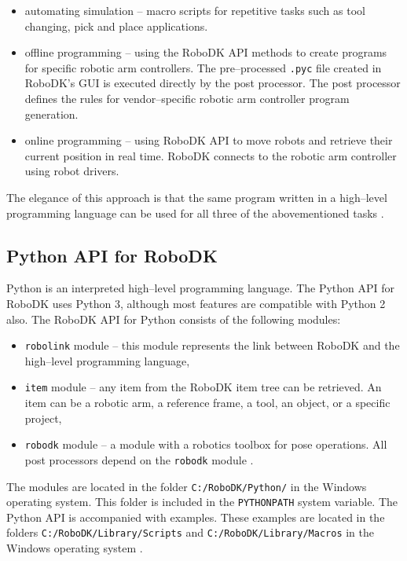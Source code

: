 \begin{itemize}
    
 \item automating simulation -- macro scripts for repetitive tasks such as tool changing, pick and place applications.

 \item offline programming -- using the RoboDK API methods to create programs for specific robotic arm controllers. The pre--processed \texttt{.pyc} file created in RoboDK's GUI is executed directly by the post processor. The post processor defines the rules for vendor--specific robotic arm controller program generation. 

 \item online programming -- using RoboDK API to move robots and retrieve their current position in real time. RoboDK connects to the robotic arm controller using robot drivers.

\end{itemize}

The elegance of this approach is that the same program written in a high--level programming language can be used for all three of the abovementioned tasks \cite{robodkapi}. 

\subsection{Python API for RoboDK}

Python is an interpreted high--level programming language. The Python API for RoboDK uses Python 3, although most features are compatible with Python 2 also. The RoboDK API for Python consists of the following modules:

\begin{itemize}
    \item \texttt{robolink} module -- this module represents the link between RoboDK and the high--level programming language,
    \item \texttt{item} module -- any item from the RoboDK item tree can be retrieved.  An item can be a robotic arm, a reference frame, a tool, an object, or a specific project,
    \item \texttt{robodk} module -- a module with a robotics toolbox for pose operations. All post processors depend on the \texttt{robodk} module .
\end{itemize}

The modules are located in the folder \texttt{C:/RoboDK/Python/} in the Windows operating system. This folder is included in the \texttt{PYTHONPATH} system variable. The Python API is accompanied with examples. These examples are located in the folders \texttt{C:/RoboDK/Library/Scripts}  and \texttt{C:/RoboDK/Library/Macros}  in the Windows operating system \cite{robodkapipython}.

